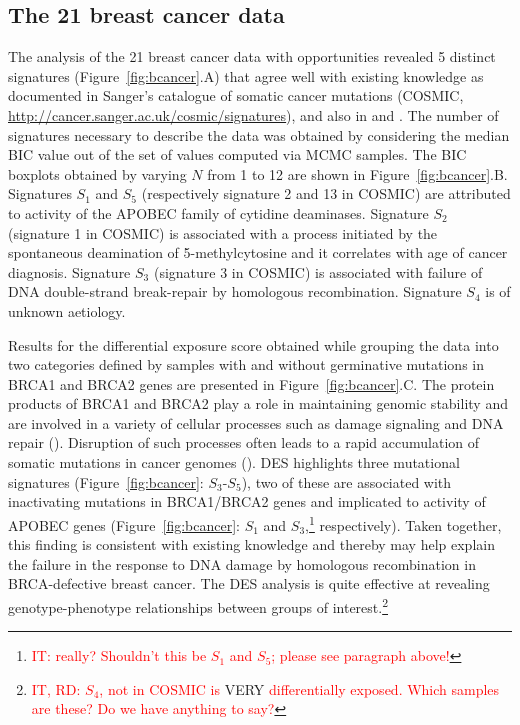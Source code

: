 \documentclass{bioinfo}
\begin{document}
\subsection{The 21 breast cancer data}
The analysis of the 21 breast cancer data with opportunities revealed
5 distinct signatures (Figure~\ref{fig:bcancer}.A) that agree well
with existing knowledge as documented in Sanger's catalogue of
somatic cancer mutations (COSMIC, 
\url{http://cancer.sanger.ac.uk/cosmic/signatures}), and also in
\cite{HEN} and \cite{ANat}. The number of signatures necessary to
describe the data was obtained by considering the median BIC value out
of the set of values computed via MCMC samples. The BIC boxplots
obtained by varying $N$ from 1 to 12 are shown in
Figure~\ref{fig:bcancer}.B. Signatures $S_1$ and $S_5$ (respectively
signature 2 and 13 in COSMIC) are attributed to activity of the APOBEC
family of cytidine deaminases.  Signature $S_2$ (signature 1 in
COSMIC) is associated with a process initiated by the spontaneous
deamination of 5-methylcytosine and it correlates with age of cancer
diagnosis. Signature $S_3$ (signature 3 in COSMIC) is associated with 
failure of DNA double-strand break-repair by homologous recombination.
Signature $S_4$ is of unknown aetiology.


Results for the differential exposure score obtained while grouping
the data into two categories defined by samples with and without
germinative mutations in BRCA1 and BRCA2 genes are presented in
Figure~\ref{fig:bcancer}.C. The protein products of BRCA1 and BRCA2
play a role in maintaining genomic stability and are involved in a
variety of cellular processes such as damage signaling and DNA repair
(\citealp{LY}). Disruption of such processes often leads to a rapid
accumulation of somatic mutations in cancer genomes
(\citealp{Ash}). DES highlights three mutational signatures
(Figure~\ref{fig:bcancer}: $S_3$-$S_5$), two of these are associated
with inactivating mutations in BRCA1/BRCA2 genes and implicated to
activity of APOBEC genes (Figure~\ref{fig:bcancer}: $S_1$ and
$S_3$,\footnote{\textcolor{red}{IT: really? Shouldn't this be $S_1$
and $S_5$; please see paragraph above!}}  respectively). Taken
together, this finding is consistent with existing knowledge and
thereby may help explain the failure in the response to DNA damage by
homologous recombination in BRCA-defective breast cancer. The DES
analysis is quite effective at revealing genotype-phenotype
relationships between groups of interest.\footnote{\textcolor{red}{IT,
RD: $S_4$, not in COSMIC is} VERY \textcolor{red}{differentially
exposed. Which samples are these? Do we have anything to say?}}
\end{document}
